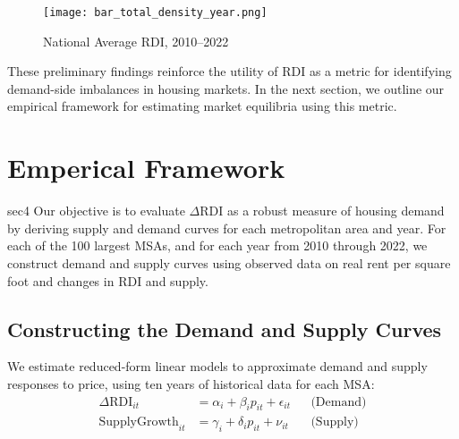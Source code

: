 \documentclass[APA,Times1COL]{WileyNJDv5} %
\begin{document}
\begin{figure}[h]
	\centering
	\texttt{[image: bar\_total\_density\_year.png]}
	\caption*{National Average RDI, 2010--2022}
	\label{fig:rdi_trend}
\end{figure}

These preliminary findings reinforce the utility of RDI as a metric for identifying demand-side imbalances in housing markets. In the next section, we outline our empirical framework for estimating market equilibria using this metric.

\section{Emperical Framework}{sec4}
Our objective is to evaluate \( \Delta \text{RDI} \) as a robust measure of housing demand by deriving supply and demand curves for each metropolitan area and year. For each of the 100 largest MSAs, and for each year from 2010 through 2022, we construct demand and supply curves using observed data on real rent per square foot and changes in RDI and supply.

\subsection{Constructing the Demand and Supply Curves}

We estimate reduced-form linear models to approximate demand and supply responses to price, using ten years of historical data for each MSA:
\begin{align*}
	\Delta \text{RDI}_{it} &= \alpha_i + \beta_i p_{it} + \epsilon_{it} && \text{(Demand)} \\
	\text{SupplyGrowth}_{it} &= \gamma_i + \delta_i p_{it} + \nu_{it} && \text{(Supply)}
\end{align*}
\end{document}
